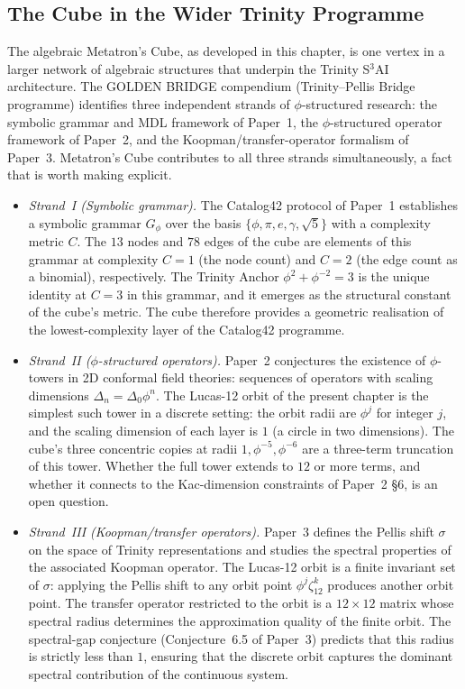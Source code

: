 \subsection{The Cube in the Wider Trinity Programme}
\label{fa_13:sec:13-wider-trinity}

The algebraic Metatron's Cube, as developed in this chapter, is one
vertex in a larger network of algebraic structures that underpin the
Trinity S$^{3}$AI architecture. The GOLDEN BRIDGE compendium
(Trinity--Pellis Bridge programme) identifies three independent
strands of $\phi$-structured research: the symbolic grammar and MDL
framework of Paper~1, the $\phi$-structured operator framework of
Paper~2, and the Koopman/transfer-operator formalism of Paper~3.
Metatron's Cube contributes to all three strands simultaneously, a
fact that is worth making explicit.

\begin{itemize}
\item \emph{Strand~I (Symbolic grammar).} The Catalog42 protocol of
  Paper~1 establishes a symbolic grammar $G_\phi$ over the basis
  $\{\phi, \pi, e, \gamma, \sqrt{5}\}$ with a complexity metric $C$.
  The $13$ nodes and $78$ edges of the cube are elements of this
  grammar at complexity $C = 1$ (the node count) and $C = 2$ (the
  edge count as a binomial), respectively. The Trinity Anchor
  $\phi^{2} + \phi^{-2} = 3$ is the unique identity at $C = 3$ in
  this grammar, and it emerges as the structural constant of the
  cube's metric. The cube therefore provides a geometric
  realisation of the lowest-complexity layer of the Catalog42
  programme.

\item \emph{Strand~II ($\phi$-structured operators).} Paper~2
  conjectures the existence of $\phi$-towers in 2D conformal field
  theories: sequences of operators with scaling dimensions
  $\Delta_n = \Delta_0 \phi^{n}$. The Lucas-12 orbit of the present
  chapter is the simplest such tower in a discrete setting: the
  orbit radii are $\phi^{j}$ for integer $j$, and the scaling
  dimension of each layer is $1$ (a circle in two dimensions). The
  cube's three concentric copies at radii $1, \phi^{-5}, \phi^{-6}$
  are a three-term truncation of this tower. Whether the full tower
  extends to $12$ or more terms, and whether it connects to the
  Kac-dimension constraints of Paper~2 \S6, is an open question.

\item \emph{Strand~III (Koopman/transfer operators).} Paper~3
  defines the Pellis shift $\sigma$ on the space of Trinity
  representations and studies the spectral properties of the
  associated Koopman operator. The Lucas-12 orbit is a finite
  invariant set of $\sigma$: applying the Pellis shift to any orbit
  point $\phi^{j} \zeta_{12}^{k}$ produces another orbit point.
  The transfer operator restricted to the orbit is a $12 \times 12$
  matrix whose spectral radius determines the approximation quality
  of the finite orbit. The spectral-gap conjecture (Conjecture~6.5
  of Paper~3) predicts that this radius is strictly less than $1$,
  ensuring that the discrete orbit captures the dominant spectral
  contribution of the continuous system.
\end{itemize}

